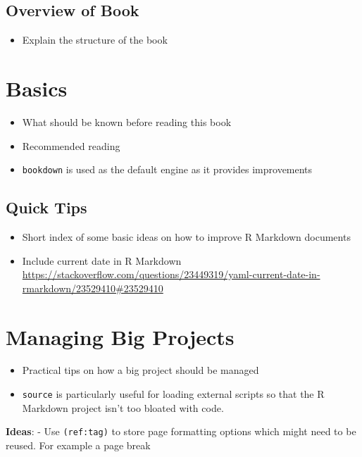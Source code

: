 \documentclass[]{book}
\providecommand{\tightlist}{%
  \setlength{\itemsep}{0pt}\setlength{\parskip}{0pt}}
\theoremstyle{definition}
\theoremstyle{definition}
\theoremstyle{definition}
\theoremstyle{remark}
\begin{document}
\section{Overview of Book}\label{overview-of-book}

\begin{itemize}
\tightlist
\item
  Explain the structure of the book
\end{itemize}

\chapter{Basics}\label{basics}

\begin{itemize}
\tightlist
\item
  What should be known before reading this book
\item
  Recommended reading
\item
  \texttt{bookdown} is used as the default engine as it provides
  improvements
\end{itemize}

\section{Quick Tips}\label{quick-tips}

\begin{itemize}
\item
  Short index of some basic ideas on how to improve R Markdown documents
\item
  Include current date in R Markdown
  \url{https://stackoverflow.com/questions/23449319/yaml-current-date-in-rmarkdown/23529410\#23529410}
\end{itemize}

\chapter{Managing Big Projects}\label{managing-big-projects}

\begin{itemize}
\tightlist
\item
  Practical tips on how a big project should be managed
\item
  \texttt{source} is particularly useful for loading external scripts so
  that the R Markdown project isn't too bloated with code.
\end{itemize}

\textbf{Ideas}: - Use \texttt{(ref:tag)} to store page formatting
options which might need to be reused. For example a page break
\end{document}
